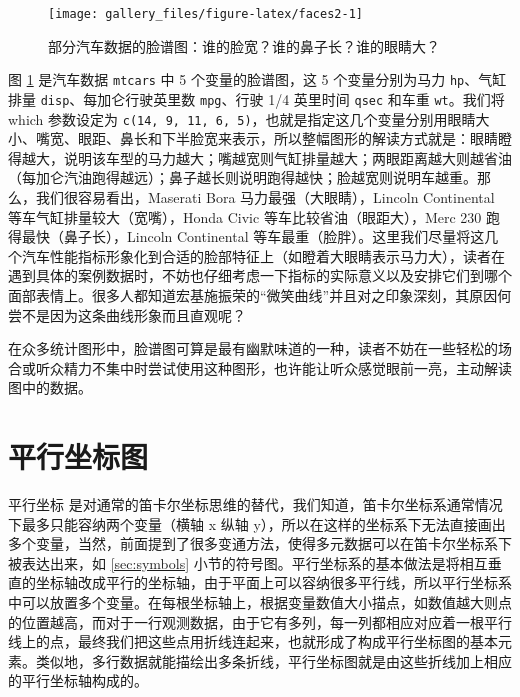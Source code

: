 \documentclass[
  b5paper,
  UTF8,twoside]{book}
\begin{document}
\begin{figure}

{\centering \texttt{[image: gallery\_files/figure-latex/faces2-1]} 

}

\caption[部分汽车数据的脸谱图]{部分汽车数据的脸谱图：谁的脸宽？谁的鼻子长？谁的眼睛大？}\label{fig:faces2}
\end{figure}

图 \ref{fig:faces2}
是汽车数据 \texttt{mtcars} 中 5 个变量的脸谱图，这 5 个变量分别为马力 \texttt{hp}、气缸排量 \texttt{disp}、每加仑行驶英里数 \texttt{mpg}、行驶 1/4 英里时间 \texttt{qsec} 和车重 \texttt{wt}。我们将 which 参数设定为 \texttt{c(14,\ 9,\ 11,\ 6,\ 5)}，也就是指定这几个变量分别用眼睛大小、嘴宽、眼距、鼻长和下半脸宽来表示，所以整幅图形的解读方式就是：眼睛瞪得越大，说明该车型的马力越大；嘴越宽则气缸排量越大；两眼距离越大则越省油（每加仑汽油跑得越远）；鼻子越长则说明跑得越快；脸越宽则说明车越重。那么，我们很容易看出，Maserati Bora 马力最强（大眼睛），Lincoln Continental 等车气缸排量较大（宽嘴），Honda Civic 等车比较省油（眼距大），Merc 230 跑得最快（鼻子长），Lincoln Continental 等车最重（脸胖）。这里我们尽量将这几个汽车性能指标形象化到合适的脸部特征上（如瞪着大眼睛表示马力大），读者在遇到具体的案例数据时，不妨也仔细考虑一下指标的实际意义以及安排它们到哪个面部表情上。很多人都知道宏基施振荣的``微笑曲线''并且对之印象深刻，其原因何尝不是因为这条曲线形象而且直观呢？

在众多统计图形中，脸谱图可算是最有幽默味道的一种，读者不妨在一些轻松的场合或听众精力不集中时尝试使用这种图形，也许能让听众感觉眼前一亮，主动解读图中的数据。

\hypertarget{sec:parcoords}{%
\section{平行坐标图}\label{sec:parcoords}}

平行坐标 \citep{Inselberg07} 是对通常的笛卡尔坐标思维的替代，我们知道，笛卡尔坐标系通常情况下最多只能容纳两个变量（横轴 x 纵轴 y），所以在这样的坐标系下无法直接画出多个变量，当然，前面提到了很多变通方法，使得多元数据可以在笛卡尔坐标系下被表达出来，如 \ref{sec:symbols} 小节的符号图。平行坐标系的基本做法是将相互垂直的坐标轴改成平行的坐标轴，由于平面上可以容纳很多平行线，所以平行坐标系中可以放置多个变量。在每根坐标轴上，根据变量数值大小描点，如数值越大则点的位置越高，而对于一行观测数据，由于它有多列，每一列都相应对应着一根平行线上的点，最终我们把这些点用折线连起来，也就形成了构成平行坐标图的基本元素。类似地，多行数据就能描绘出多条折线，平行坐标图就是由这些折线加上相应的平行坐标轴构成的。
\end{document}
